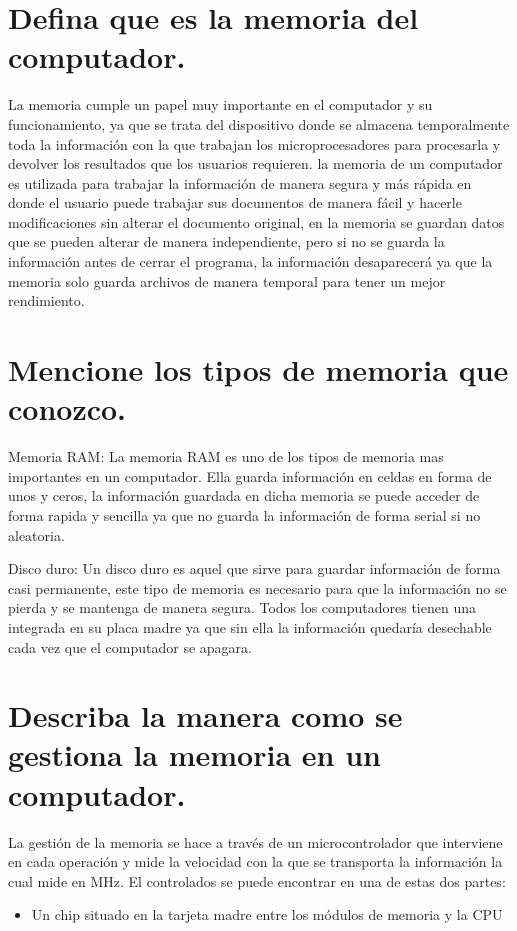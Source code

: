 \documentclass{article}
\begin{document}
\section{Defina que es la memoria del computador.}

La memoria cumple un papel muy importante en el computador y su funcionamiento, ya que se trata del dispositivo donde se almacena temporalmente toda la información con la que trabajan
los microprocesadores para procesarla y devolver los resultados que los usuarios requieren.
la memoria de un computador es utilizada para trabajar la información de manera segura y más rápida en donde el usuario puede trabajar sus documentos de manera fácil y hacerle modificaciones sin alterar el documento original, en la memoria se guardan datos que se pueden alterar de manera independiente, pero si no se guarda la información antes de cerrar el programa, la información desaparecerá ya que la memoria solo guarda archivos de manera temporal para tener un mejor rendimiento.


\section{Mencione los tipos de memoria que conozco.} \label{contenido}

Memoria RAM: La memoria RAM es uno de los tipos de memoria mas
importantes en un computador. Ella guarda información en celdas en forma de unos y ceros, la información guardada en dicha memoria se puede acceder de forma rapida y sencilla ya que no guarda la información de forma serial si no
aleatoria.

Disco duro: Un disco duro es aquel que sirve para guardar información de forma casi permanente, este tipo de memoria es necesario para que la información no se pierda y se mantenga de manera segura. Todos los computadores
tienen una integrada en su placa madre ya que sin ella la información quedaría desechable cada vez que el computador se apagara.


\section{Describa la manera como se gestiona la memoria en un computador.}

La gestión de la memoria se hace a través de un microcontrolador que interviene en cada operación y mide la velocidad con la que se transporta la información la cual mide en MHz. El controlados se puede encontrar en una de estas dos partes:
\begin{itemize}
\item{ Un chip situado en la tarjeta madre entre los módulos de memoria y la CPU}
\end{itemize}
\end{document}
